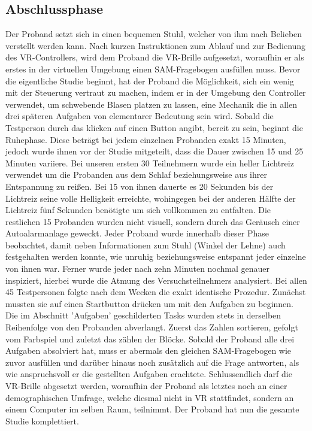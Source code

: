\subsection{Abschlussphase}
Der Proband setzt sich in einen bequemen Stuhl, welcher von ihm nach Belieben verstellt werden kann. Nach kurzen Instruktionen zum Ablauf und zur Bedienung des VR-Controllers, wird dem Proband die VR-Brille aufgesetzt, woraufhin er als erstes in der virtuellen Umgebung einen SAM-Fragebogen ausfüllen muss. %
Bevor die eigentliche Studie beginnt, hat der Proband die Möglichkeit, sich ein wenig mit der Steuerung vertraut zu machen, indem er in der Umgebung den Controller verwendet, um schwebende Blasen platzen zu lassen, eine Mechanik die in allen drei späteren Aufgaben von elementarer Bedeutung sein wird. Sobald die Testperson durch das klicken auf einen Button angibt, bereit zu sein, beginnt die Ruhephase. Diese beträgt bei jedem einzelnen Probanden exakt 15 Minuten, jedoch wurde ihnen vor der Studie mitgeteilt, dass die Dauer zwischen 15 und 25 Minuten variiere. %
Bei unseren ersten 30 Teilnehmern wurde ein heller Lichtreiz verwendet um die Probanden aus dem Schlaf beziehungsweise aus ihrer Entspannung zu reißen. Bei 15 von ihnen dauerte es 20 Sekunden bis der Lichtreiz seine volle Helligkeit erreichte, wohingegen bei der anderen Hälfte der Lichtreiz fünf Sekunden benötigte um sich vollkommen zu entfalten.  Die restlichen 15 Probanden wurden nicht visuell, sondern durch das Geräusch einer Autoalarmanlage geweckt. %
Jeder Proband wurde innerhalb dieser Phase beobachtet, damit neben Informationen zum Stuhl (Winkel der Lehne) auch festgehalten werden konnte, wie unruhig beziehungsweise entspannt jeder einzelne von ihnen war. Ferner wurde jeder nach zehn Minuten nochmal genauer inspiziert, hierbei wurde die Atmung des Versuchsteilnehmers analysiert.
Bei allen 45 Testpersonen folgte nach dem Wecken die exakt identische Prozedur. Zunächst mussten sie auf einen Startbutton drücken um mit den Aufgaben zu beginnen. Die im Abschnitt 'Aufgaben' geschilderten Tasks wurden stets in derselben Reihenfolge von den Probanden abverlangt. Zuerst das Zahlen sortieren, gefolgt vom Farbspiel und zuletzt das zählen der Blöcke. %
Sobald der Proband alle drei Aufgaben absolviert hat, muss er abermals den gleichen SAM-Fragebogen wie zuvor ausfüllen und darüber hinaus noch zusätzlich auf die Frage antworten, als wie anspruchsvoll er die gestellten Aufgaben erachtete.
Schlussendlich darf die VR-Brille abgesetzt werden, woraufhin der Proband als letztes noch an einer demographischen Umfrage, welche diesmal nicht in VR stattfindet, sondern an einem Computer im selben Raum, teilnimmt. Der Proband hat nun die gesamte Studie komplettiert.
